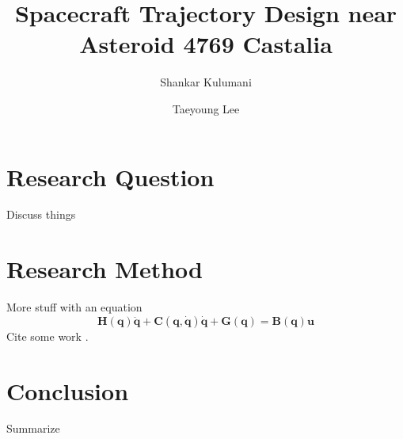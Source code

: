 \documentclass[11pt,reqno]{amsart} %
\title{Spacecraft Trajectory Design near Asteroid 4769 Castalia}
\author{Shankar Kulumani}
\author{Taeyoung Lee}
\date{} %
\begin{document}
\maketitle
\begin{multicols}{2}
\section{Research Question}
Discuss things
\section{Research Method}
More stuff with an equation
\begin{equation}
	\bm{H(q) \ddot{q} + C(q,\dot{q}) \dot{q} + G(q) = B(q) u}
	\label{eq:std_dyn}
\end{equation}
Cite some work \cite{marsden2001}.
\section{Conclusion}
Summarize



\end{multicols}
\end{document}
